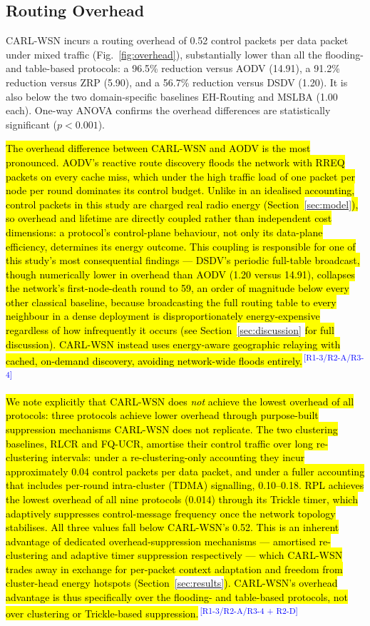 \documentclass[12pt]{article}
\newcommand{\rtag}[1]{\textsuperscript{\textcolor{blue}{\scriptsize\,[#1]}}}
\newcommand{\hlx}[1]{{\exhyphenpenalty=10000\hyphenpenalty=10000\let\ \nobreakspace\hl{#1}}}
\begin{document}
\subsection{Routing Overhead}

CARL-WSN incurs a routing overhead of 0.52 control packets per data
packet under mixed traffic (Fig.~\ref{fig:overhead}), substantially
lower than all the flooding- and table-based protocols: a
96.5\% reduction versus AODV (14.91), a 91.2\% reduction versus
ZRP (5.90), and a 56.7\% reduction versus DSDV (1.20). It is also
below the two domain-specific baselines EH-Routing and MSLBA
(1.00 each). One-way ANOVA confirms the overhead differences are
statistically significant ($p < 0.001$).

\hlx{The overhead difference between CARL-WSN and AODV is the most
pronounced. AODV's reactive route discovery floods the network with
RREQ packets on every cache miss, which under the high traffic load
of one packet per node per round dominates its control budget. Unlike
in an idealised accounting, control packets in this study are charged
real radio energy (Section~}\ref{sec:model}\hlx{), so overhead and lifetime
are directly coupled rather than independent cost dimensions: a
protocol's control-plane behaviour, not only its data-plane
efficiency, determines its energy outcome. This coupling is
responsible for one of this study's most consequential findings ---
DSDV's periodic full-table broadcast, though numerically lower in
overhead than AODV (1.20 versus 14.91), collapses the network's
first-node-death round to 59, an order of magnitude below every
other classical baseline, because broadcasting the full routing
table to every neighbour in a dense deployment is disproportionately
energy-expensive regardless of how infrequently it occurs (see
Section~}\ref{sec:discussion}\hlx{ for full discussion). CARL-WSN instead
uses energy-aware geographic relaying with cached, on-demand
discovery, avoiding network-wide floods entirely.}\rtag{R1-3/R2-A/R3-4}

\hlx{We note explicitly that CARL-WSN does \emph{not} achieve the lowest
overhead of all protocols: three protocols achieve lower overhead
through purpose-built suppression mechanisms CARL-WSN does not
replicate. The two clustering baselines, RLCR and FQ-UCR, amortise
their control traffic over long re-clustering intervals: under a
re-clustering-only accounting they incur approximately 0.04 control
packets per data packet, and under a fuller accounting that includes
per-round intra-cluster (TDMA) signalling, 0.10--0.18. RPL achieves
the lowest overhead of all nine protocols (0.014) through its
Trickle timer, which adaptively suppresses control-message frequency
once the network topology stabilises. All three values fall below
CARL-WSN's 0.52. This is an inherent advantage of dedicated
overhead-suppression mechanisms --- amortised re-clustering and
adaptive timer suppression respectively --- which CARL-WSN trades
away in exchange for per-packet context adaptation and freedom from
cluster-head energy hotspots (Section~}\ref{sec:results}\hlx{). CARL-WSN's
overhead advantage is thus specifically over the flooding- and
table-based protocols, not over clustering or Trickle-based
suppression.}\rtag{R1-3/R2-A/R3-4 + R2-D}
\end{document}

